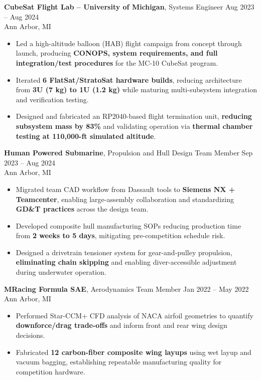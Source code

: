 \documentclass[10pt]{article}
\begin{document}
{\bfseries CubeSat Flight Lab -- University of Michigan}, Systems Engineer \hfill Aug 2023 -- Aug 2024 \\
Ann Arbor, MI
\begin{itemize}
  \item Led a high-altitude balloon (HAB) flight campaign from concept through launch, producing \textbf{CONOPS, system requirements, and full integration/test procedures} for the MC-10 CubeSat program.
  \item Iterated \textbf{6 FlatSat/StratoSat hardware builds}, reducing architecture from \textbf{3U (7 kg) to 1U (1.2 kg)} while maturing multi-subsystem integration and verification testing.
  \item Designed and fabricated an RP2040-based flight termination unit, {\bfseries reducing subsystem mass by 83\%} and validating operation via \textbf{thermal chamber testing at 110,000-ft simulated altitude}.
\end{itemize}

{\bfseries Human Powered Submarine}, Propulsion and Hull Design Team Member \hfill Sep 2023 -- Aug 2024 \\
Ann Arbor, MI
\begin{itemize}
  \item Migrated team CAD workflow from Dassault tools to \textbf{Siemens NX + Teamcenter}, enabling large-assembly collaboration and standardizing \textbf{GD\&T practices} across the design team.
  \item Developed composite hull manufacturing SOPs reducing production time from \textbf{2 weeks to 5 days}, mitigating pre-competition schedule risk.
  \item Designed a drivetrain tensioner system for gear-and-pulley propulsion, \textbf{eliminating chain skipping} and enabling diver-accessible adjustment during underwater operation.

\end{itemize}

{\bfseries MRacing Formula SAE}, Aerodynamics Team Member \hfill Jan 2022 -- May 2022 \\
Ann Arbor, MI
\begin{itemize}
  \item Performed Star-CCM+ CFD analysis of NACA airfoil geometries to quantify \textbf{downforce/drag trade-offs} and inform front and rear wing design decisions.
  \item Fabricated \textbf{12 carbon-fiber composite wing layups} using wet layup and vacuum bagging, establishing repeatable manufacturing quality for competition hardware.

\end{itemize}
\end{document}
